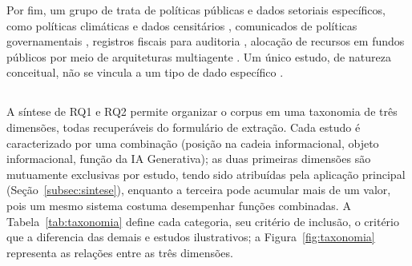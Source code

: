 Por fim, um grupo de  trata de políticas públicas e dados setoriais específicos, como políticas climáticas e dados censitários \citep{CLEAR2025}, comunicados de políticas governamentais \citep{HybridGraphRAG2025}, registros fiscais para auditoria \citep{Monsalvo2025}, alocação de recursos em fundos públicos por meio de arquiteturas multiagente \citep{Gong2025} \ifhl\mbox{\colorbox{yellow}{\citep{Giarelis2026}}}\else\citep{Giarelis2026}\fi. Um único estudo, de natureza conceitual, não se vincula a um tipo de dado específico \citep{Loukis2023}.


\subsection{\texorpdfstring{}{Taxonomia dos usos de IA Generativa no acesso à informacao publica}}
\label{subsec:taxonomia}

A síntese de RQ1 e RQ2 permite organizar o corpus em uma taxonomia de três dimensões, todas recuperáveis do formulário de extração. Cada estudo é caracterizado por uma combinação (posição na cadeia informacional, objeto informacional, função da IA Generativa); as duas primeiras dimensões são mutuamente exclusivas por estudo, tendo sido atribuídas pela aplicação principal (Seção~\ref{subsec:sintese}), enquanto a terceira pode acumular mais de um valor, pois um mesmo sistema costuma desempenhar funções combinadas. A Tabela~\ref{tab:taxonomia} define cada categoria, seu critério de inclusão, o critério que a diferencia das demais e estudos ilustrativos; a Figura~\ref{fig:taxonomia} representa as relações entre as três dimensões.

